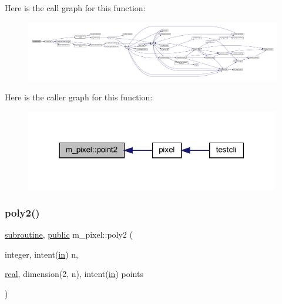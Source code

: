 Here is the call graph for this function\+:
\nopagebreak
\begin{figure}[H]
\begin{center}
\leavevmode
\includegraphics[width=350pt]{namespacem__pixel_a11234e0b33104eb0afb24f928b072053_cgraph}
\end{center}
\end{figure}
Here is the caller graph for this function\+:
\nopagebreak
\begin{figure}[H]
\begin{center}
\leavevmode
\includegraphics[width=315pt]{namespacem__pixel_a11234e0b33104eb0afb24f928b072053_icgraph}
\end{center}
\end{figure}
\mbox{\label{namespacem__pixel_a996117d631dce0e92056a0c486be5109}} 
\subsubsection{\texorpdfstring{poly2()}{poly2()}}
{\footnotesize\ttfamily \hyperlink{M__stopwatch_83_8txt_acfbcff50169d691ff02d4a123ed70482}{subroutine}, \hyperlink{M__stopwatch_83_8txt_a2f74811300c361e53b430611a7d1769f}{public} m\+\_\+pixel\+::poly2 (\begin{DoxyParamCaption}\item[{integer, intent(\hyperlink{M__journal_83_8txt_afce72651d1eed785a2132bee863b2f38}{in})}]{n,  }\item[{\hyperlink{read__watch_83_8txt_abdb62bde002f38ef75f810d3a905a823}{real}, dimension(2, n), intent(\hyperlink{M__journal_83_8txt_afce72651d1eed785a2132bee863b2f38}{in})}]{points }\end{DoxyParamCaption})}



